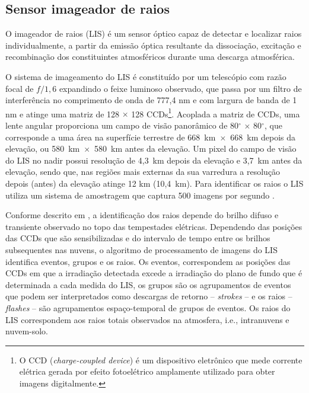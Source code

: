 \subsection{Sensor imageador de raios}

O imageador de raios (LIS) é um sensor óptico capaz de detectar e localizar raios individualmente, a partir da emissão óptica resultante da dissociação, excitação e recombinação dos constituintes atmosféricos durante uma descarga atmosférica. 

O sistema de imageamento do LIS é constituído por um telescópio com razão focal de $f/1,6$ expandindo o feixe luminoso observado, que passa por um filtro de interferência no comprimento de onda de 777,4 nm e com largura de banda de 1 nm e atinge uma matriz de 128 $\times$ 128 CCDs\footnote{O CCD (\textit{charge-coupled device}) é um dispositivo eletrônico que mede corrente elétrica gerada por efeito fotoelétrico amplamente utilizado para obter imagens digitalmente.}. Acoplada a matriz de CCDs, uma lente angular proporciona um campo de visão panorâmico de 80$^{\circ}$ $\times$ 80$^{\circ}$, que corresponde a uma área na superfície terrestre de 668~km~$\times$~668~km depois da elevação, ou 580~km~$\times$~580~km antes da elevação. Um pixel do campo de visão do LIS no nadir possui resolução de 4,3~km depois da elevação e  3,7~km antes da elevação, sendo que, nas regiões mais externas da sua varredura a resolução depois (antes) da elevação atinge 12 km (10,4~km). Para identificar os raios o LIS utiliza um sistema de amostragem que captura 500 imagens por segundo \cite{christian2000LISalgorithm,boccippio1996science,trmmhandbook}. 


Conforme descrito em , a identificação dos raios depende do brilho difuso e transiente observado no topo das tempestades elétricas. Dependendo das posições das CCDs que são sensibilizadas e do intervalo de tempo entre os brilhos subsequentes nas nuvens, o algoritmo de processamento de imagens do LIS identifica eventos, grupos e os raios. Os eventos, correspondem as posições das CCDs em que a irradiação detectada excede a irradiação do plano de fundo que é determinada a cada medida do LIS, os grupos são os agrupamentos de eventos que podem ser interpretados como descargas de retorno -- \textit{strokes} -- e os raios -- \textit{flashes} -- são  agrupamentos espaço-temporal de grupos de eventos. Os raios do LIS correspondem aos raios totais observados na atmosfera, i.e., intranuvens e nuvem-solo.

